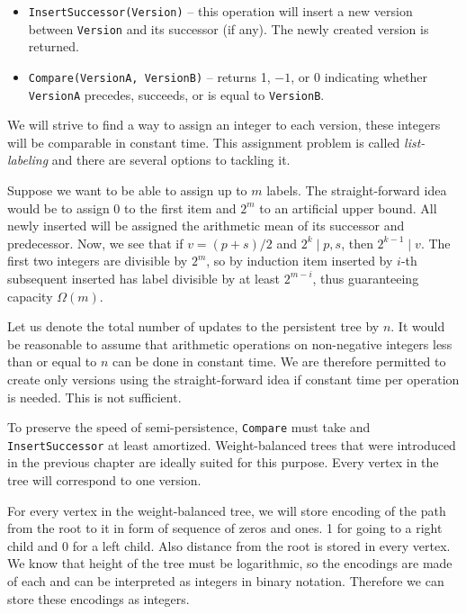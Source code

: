 \begin{itemize}
	\item \texttt{InsertSuccessor(Version)} -- this operation will insert a new version between \texttt{Version} and its successor (if any). The newly created version is returned.
	\item \texttt{Compare(VersionA, VersionB)} -- returns 1, $-1$, or 0 indicating whether \texttt{VersionA} precedes, succeeds, or is equal to \texttt{VersionB}.
\end{itemize}

We will strive to find a way to assign an integer to each version, these integers will be comparable in constant time. This assignment problem is called \emph{list-labeling} and there are several options to tackling it.

Suppose we want to be able to assign up to $m$ labels. The straight-forward idea would be to assign 0 to the first item and $2^m$ to an artificial upper bound. All newly inserted will be assigned the arithmetic mean of its successor and predecessor. Now, we see that if $v = (p + s)/2$ and $ 2^k \mid p, s$, then $2^{k-1} \mid v$. The first two integers are divisible by $2^m$, so by induction item inserted by $i$-th subsequent inserted has label divisible by at least $2^{m-i}$, thus guaranteeing capacity $\Omega(m)$. 

Let us denote the total number of updates to the persistent tree by $n$. It would be reasonable to  assume that arithmetic operations on non-negative integers less than or equal to $n$ can be done in constant time. We are therefore permitted to create only  versions using the straight-forward idea if constant time per operation is needed. This is not sufficient.

To preserve the speed of semi-persistence, \texttt{Compare} must take  and \linebreak \texttt{InsertSuccessor}  at least amortized. Weight-balanced trees that were introduced in the previous chapter are ideally suited for this purpose. Every vertex in the tree will correspond to one version.

For every vertex in the weight-balanced tree, we will store encoding of the path from the root to it in form of sequence of zeros and ones. 1 for going to a right child and 0 for a left child. Also distance from the root is stored in every vertex. We know that height of the tree must be logarithmic, so the encodings are made of  each and can be interpreted as integers in binary notation. Therefore we can store these encodings as integers.

